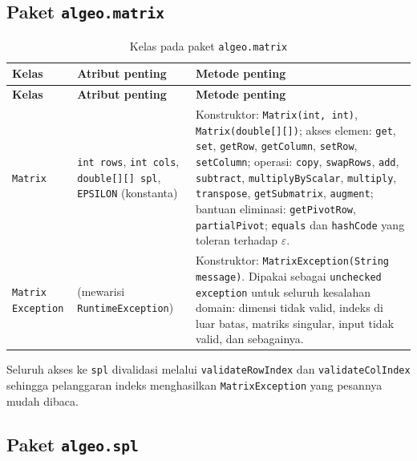 \documentclass[12pt,a4paper]{report}
\begin{document}
\subsection{Paket \texttt{algeo.matrix}}

\begin{longtable}{p{2.5cm} p{4.5cm} p{7cm}}
\caption{Kelas pada paket \texttt{algeo.matrix}}
\label{tab:kelas-matrix} \\
\toprule
\textbf{Kelas} & \textbf{Atribut penting} & \textbf{Metode penting} \\
\midrule
\endfirsthead

\toprule
\textbf{Kelas} & \textbf{Atribut penting} & \textbf{Metode penting} \\
\midrule
\endhead

\bottomrule
\endfoot

\texttt{Matrix} &
\texttt{int rows}, \texttt{int cols}, \texttt{double[][] spl}, \texttt{EPSILON} (konstanta) &
Konstruktor: \texttt{Matrix(int, int)}, \texttt{Matrix(double[][])};
\newline akses elemen: \texttt{get}, \texttt{set}, \texttt{getRow}, \texttt{getColumn},
\texttt{setRow}, \texttt{setColumn};
\newline operasi: \texttt{copy}, \texttt{swapRows}, \texttt{add}, \texttt{subtract},
\texttt{multiplyByScalar}, \texttt{multiply}, \texttt{transpose},
\texttt{getSubmatrix}, \texttt{augment};
\newline bantuan eliminasi: \texttt{getPivotRow}, \texttt{partialPivot};
\texttt{equals} dan \texttt{hashCode} yang toleran terhadap $\varepsilon$. \\
\addlinespace
\texttt{Matrix \newline Exception} &
(mewarisi \texttt{RuntimeException}) &
Konstruktor: \texttt{MatrixException(String message)}. Dipakai sebagai
\texttt{unchecked exception} untuk seluruh kesalahan domain: dimensi tidak
valid, indeks di luar batas, matriks singular, input tidak valid, dan
sebagainya. \\
\end{longtable}

Seluruh akses ke \texttt{spl} divalidasi melalui \texttt{validateRowIndex} dan
\texttt{validateColIndex} sehingga pelanggaran indeks menghasilkan
\texttt{MatrixException} yang pesannya mudah dibaca.

\subsection{Paket \texttt{algeo.spl}}
\end{document}
